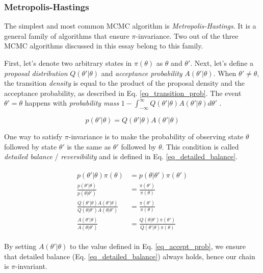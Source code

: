 \documentclass[12pt]{article}
\begin{document}
{\subsubsection{Metropolis-Hastings}

The simplest and most common MCMC algorithm is \textit{Metropolis-Hastings}. It is a general family of algorithms that ensure $\pi$-invariance. Two out of the three MCMC algorithms discussed in this essay belong to this family.

First, let's denote two arbitrary states in $\pi(\theta)$ as $\theta$ and $\theta'$. Next, let's define a \textit{proposal distribution} $Q(\theta'|\theta)$ and \textit{acceptance probability} $A(\theta'|\theta)$. When $\theta' \ne \theta$, the transition \textit{density} is equal to the product of the proposal density and the acceptance probability, as described in Eq. \ref{eq_transition_prob}. The event $\theta' = \theta$ happens with \textit{probability mass} $1-\int_{-\infty}^{\infty} Q(\theta'|\theta)A(\theta'|\theta) d\theta'$ .

\begin{equation}
p(\theta'|\theta) = Q(\theta'|\theta)A(\theta'|\theta)
\label{eq_transition_prob}
\end{equation}

One way to satisfy $\pi$-invariance is to make the probability of observing state $\theta$ followed by state $\theta'$ is the same as $\theta'$ followed by $\theta$. This condition is called \textit{detailed balance} / \textit{reversibility} and is defined in Eq. \ref{eq_detailed_balance}.

\begin{align}
\begin{split}
p(\theta'|\theta)\pi(\theta) &= p(\theta|\theta')\pi(\theta') \\
\frac{p(\theta'|\theta)}{p(\theta|\theta')} &= \frac{\pi(\theta')}{\pi(\theta)} \\
\frac{Q(\theta'|\theta)A(\theta'|\theta)}{Q(\theta|\theta')A(\theta|\theta')} &= \frac{\pi(\theta')}{\pi(\theta)} \\
\frac{A(\theta'|\theta)}{A(\theta|\theta')} &= \frac{Q(\theta|\theta')\pi(\theta')}{Q(\theta'|\theta)\pi(\theta)}
\label{eq_detailed_balance}
\end{split}
\end{align}

By setting $A(\theta'|\theta)$ to the value defined in Eq. \ref{eq_accept_prob}, we ensure that detailed balance (Eq. \ref{eq_detailed_balance}) always holds, hence our chain is $\pi$-invariant. 

}
\end{document}
